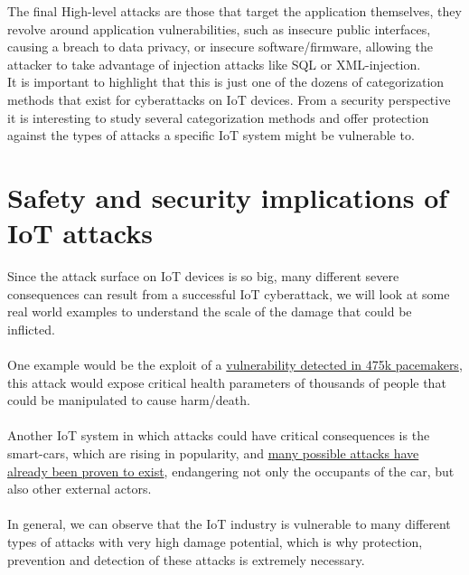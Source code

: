 The final High-level attacks are those that target the application themselves, they revolve around application vulnerabilities, such as insecure public interfaces, causing a breach to data privacy, or insecure software/firmware, allowing the attacker to take advantage of injection attacks like SQL or XML-injection.\\

It is important to highlight that this is just one of the dozens of categorization methods that exist for cyberattacks on IoT devices. From a security perspective it is interesting to study several categorization methods and offer protection against the types of attacks a specific IoT system might be vulnerable to.\\


\section{Safety and security implications of IoT attacks}
Since the attack surface on IoT devices is so big, many different severe consequences can result from a successful IoT cyberattack, we will look at some real world examples to understand the scale of the damage that could be inflicted.
\\~\\
One example would be the exploit of a \hyperlink{https://thehealthcareblog.com/blog/2019/07/29/security-crisis-of-cardiac-pacemakers-paves-the-way-for-iot-security-evolution-in-cardiology/}{vulnerability detected in 475k pacemakers}, this attack would expose critical health parameters of thousands of people that could be manipulated to cause harm/death.
\\~\\
Another IoT system in which attacks could have critical consequences is the smart-cars, which are rising in popularity, and \hyperlink{https://www.lifewire.com/how-self-driving-cars-can-be-hacked-5114337}{many possible attacks have already been proven to exist}, endangering not only the occupants of the car, but also other external actors. 
\\~\\
In general, we can observe that the IoT industry is vulnerable to many different types of attacks with very high damage potential, which is why protection, prevention and detection of these attacks is extremely necessary.



